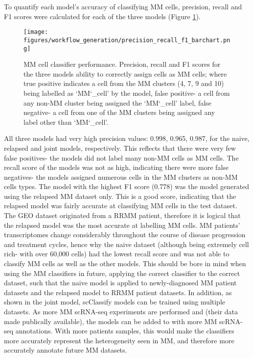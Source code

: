 To quantify each model's accuracy of classifying MM cells, precision, recall and F1 scores were calculated for each of the three models (Figure \ref{fig:mm_class_accuracy_bar}).
%
\begin{figure}[htb]
\centering
\texttt{[image: figures/workflow\_generation/precision\_recall\_f1\_barchart.png]}
\caption[MM classifier accuracy]{MM cell classifier performance.
Precision, recall and F1 scores for the three models ability to correctly assign cells as MM cells; where true positive indicates a cell from the MM clusters (4, 7, 9 and 10) being labelled as `MM\char`_cell' by the model, false positive- a cell from any non-MM cluster being assigned the `MM\char`_cell' label, false negative- a cell from one of the MM clusters being assigned any label other than `MM\char`_cell'.
}
\label{fig:mm_class_accuracy_bar}
\end{figure}
%
All three models had very high precision values: 0.998, 0.965, 0.987, for the naive, relapsed and joint models, respectively.
This reflects that there were very few false positives- the models did not label many non-MM cells as MM cells.
The recall score of the models was not as high, indicating there were more false negatives- the models assigned numerous cells in the MM clusters as non-MM cells types.
The model with the highest F1 score (0.778) was the model generated using the relapsed MM dataset only.
This is a good score, indicating that the relapsed model was fairly accurate at classifying MM cells in the test dataset.
The GEO dataset originated from a RRMM patient, therefore it is logical that the relapsed model was the most accurate at labelling MM cells.
MM patients' transcriptomes change considerably throughout the course of disease progression and treatment cycles, hence why the naive dataset (although being extremely cell rich- with over 60,000 cells) had the lowest recall score and was not able to classify MM cells as well as the other models.
This should be bore in mind when using the MM classifiers in future, applying the correct classifier to the correct dataset, such that the naive model is applied to newly-diagnosed MM patient datasets and the relapsed model to RRMM patient datasets.
In addition, as shown in the joint model, scClassify models can be trained using multiple datasets.
As more MM scRNA-seq experiments are performed and (their data made publically available), the models can be added to with more MM scRNA-seq annotations.
With more patients samples, this would make the classifiers more accurately represent the heterogeneity seen in MM, and therefore more accurately annotate future MM datasets.


